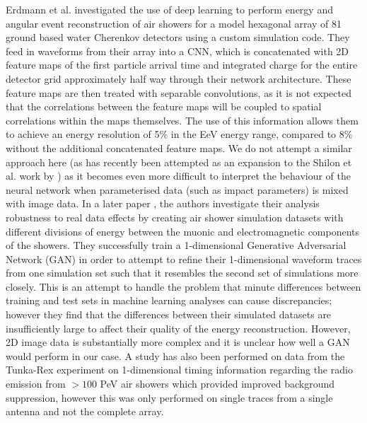 Erdmann et al. \cite{aug1} investigated the use of deep learning to perform energy and angular event reconstruction of air showers for a model hexagonal array of 81 ground based water Cherenkov detectors using a custom simulation code. They feed in waveforms from their array into a CNN, which is concatenated with 2D feature maps of the first particle arrival time and integrated charge for the entire detector grid approximately half way through their network architecture. These feature maps are then treated with separable convolutions, as it is not expected that the correlations between the feature maps will be coupled to spatial correlations within the maps themselves. The use of this information allows them to achieve an energy resolution of 5\% in the EeV energy range, compared to 8\% without the additional concatenated feature maps. We do not attempt a similar approach here (as has recently been attempted as an expansion to the Shilon et al. work by \cite{ParsonsOhm}) as it becomes even more difficult to interpret the behaviour of the neural network when parameterised data (such as impact parameters) is mixed with image data. In a later paper \cite{ErdmannAuger}, the authors investigate their analysis robustness to real data effects by creating air shower simulation datasets with different divisions of energy between the muonic and electromagnetic components of the showers. They successfully train a 1-dimensional Generative Adversarial Network (GAN) in order to attempt to refine their 1-dimensional waveform traces from one simulation set such that it resembles the second set of simulations more closely. This is an attempt to handle the problem that minute differences between training and test sets in machine learning analyses can cause discrepancies; however they find that the differences between their simulated datasets are insufficiently large to affect their quality of the energy reconstruction. However, 2D image data is substantially more complex and it is unclear how well a GAN would perform in our case. A study has also been performed on data from the Tunka-Rex experiment \cite{tunka} on 1-dimensional timing information regarding the radio emission from $>100$ PeV air showers which provided improved background suppression, however this was only performed on single traces from a single antenna and not the complete array.


